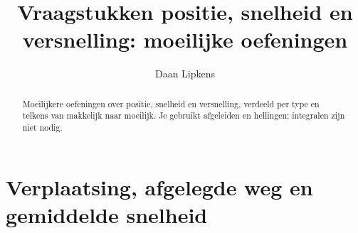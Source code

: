 \documentclass{ximera}
\title{Vraagstukken positie, snelheid en versnelling: moeilijke oefeningen}
\author{Daan Lipkens}
\begin{document}
\begin{abstract}
    Moeilijkere oefeningen over positie, snelheid en versnelling, verdeeld per type en telkens van makkelijk naar moeilijk. Je gebruikt afgeleiden en hellingen; integralen zijn niet nodig.
\end{abstract}
\maketitle

\section{Verplaatsing, afgelegde weg en gemiddelde snelheid}

\end{document}
